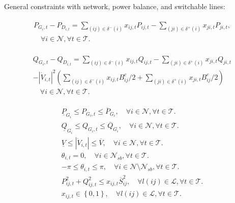 \documentclass{article}
\begin{document}
General constraints with network, power balance, and switchable lines:
{\allowdisplaybreaks
\begin{align}
  \begin{split}
    P_{G_{i},t} - P_{D_{i,t}} = \sum_{(ij) \in \delta^{-}(i)}x_{ij,t}P_{ij,t} - \sum_{(ji) \in \delta^{+}(i)}x_{ji,t}P_{ji,t},
    \\ \quad \forall i \in \mathcal{N}, \forall t \in \mathcal{T}.
  \end{split}
\end{align}

\begin{align}
  \begin{split}
    Q_{G_{i},t} - Q_{D_{i,t}} = \sum_{(ij) \in \delta^{-}(i)}x_{ij,t}Q_{ij,t} - \sum_{(ji) \in \delta^{+}(i)}x_{ji,t}Q_{ji,t}  
    \\- \left|\dot{V}_{i,t} \right|^2(\sum_{(ij) \in \delta^{-}(i)}x_{ij,t}B^{c}_{ij}/2 +  \sum_{(ji) \in \delta^{+}(i)}x_{ji,t}B^{c}_{ij}/2)  
    \\ \quad \forall i \in \mathcal{N}, \forall t \in \mathcal{T}.
  \end{split}
\end{align}

\begin{align}
  \underline{P}_{G_{i}} \leq P_{G_{i},t} \leq \overline{P}_{G_{i}},  \quad \forall i \in \mathcal{N}, \forall t \in \mathcal{T}.\\
  \underline{Q}_{G_{i}} \leq Q_{G_{i},t} \leq \overline{Q}_{G_{i}},  \quad \forall i \in \mathcal{N}, \forall t \in \mathcal{T}.\\
  \underline{V} \leq \left|\dot{V}_{i,t} \right| \leq \overline{V},  \quad \forall i \in \mathcal{N}, \forall t \in \mathcal{T}.\\
  \theta_{i,t} = 0, \quad \forall i \in \mathcal{N}_{sb}, \forall t \in \mathcal{T}.\\
  -\pi \leq \theta_{i,t} \leq \pi, \quad \forall i \in \mathcal{N} \setminus \mathcal{N}_{sb}, \forall t \in \mathcal{T}.\\
  P_{ij,t}^{2}+ Q_{ij,t}^{2} \leq x_{ij,t}\overline{S}_{ij}^{2}, \quad   \forall l(ij) \in \mathcal{L}, \forall t \in \mathcal{T}.\\
  x_{ij,t} \in \left\{0,1 \right\}, \quad   \forall l(ij) \in \mathcal{L}, \forall t \in \mathcal{T}.
\end{align}
}
\end{document}
